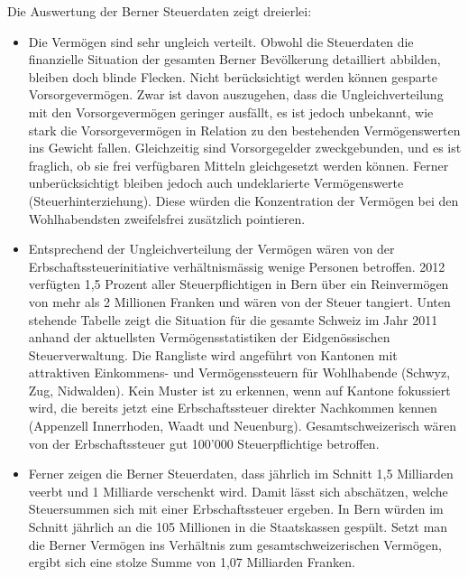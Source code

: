 \documentclass[a4paper, 12pt,liststotoc]{scrartcl}
\numberwithin{equation}{section}
\begin{document}
Die Auswertung der Berner Steuerdaten zeigt dreierlei:

\begin{itemize}
\item
  Die Vermögen sind sehr ungleich verteilt. Obwohl die Steuerdaten die
  finanzielle Situation der gesamten Berner Bevölkerung detailliert
  abbilden, bleiben doch blinde Flecken. Nicht berücksichtigt werden
  können gesparte Vorsorgevermögen. Zwar ist davon auszugehen, dass die
  Ungleichverteilung mit den Vorsorgevermögen geringer ausfällt, es ist
  jedoch unbekannt, wie stark die Vorsorgevermögen in Relation zu den
  bestehenden Vermögenswerten ins Gewicht fallen. Gleichzeitig sind
  Vorsorgegelder zweckgebunden, und es ist fraglich, ob sie frei
  verfügbaren Mitteln gleichgesetzt werden können. Ferner
  unberücksichtigt bleiben jedoch auch undeklarierte Vermögenswerte
  (Steuerhinterziehung). Diese würden die Konzentration der Vermögen bei
  den Wohlhabendsten zweifelsfrei zusätzlich pointieren.
\item
  Entsprechend der Ungleichverteilung der Vermögen wären von der
  Erbschaftssteuerinitiative verhältnismässig wenige Personen betroffen.
  2012 verfügten 1,5 Prozent aller Steuerpflichtigen in Bern über ein
  Reinvermögen von mehr als 2 Millionen Franken und wären von der Steuer
  tangiert. Unten stehende Tabelle zeigt die Situation für die gesamte
  Schweiz im Jahr 2011 anhand der aktuellsten Vermögensstatistiken der
  Eidgenössischen Steuerverwaltung. Die Rangliste wird angeführt von
  Kantonen mit attraktiven Einkommens- und Vermögenssteuern für
  Wohlhabende (Schwyz, Zug, Nidwalden). Kein Muster ist zu erkennen,
  wenn auf Kantone fokussiert wird, die bereits jetzt eine
  Erbschaftssteuer direkter Nachkommen kennen (Appenzell Innerrhoden,
  Waadt und Neuenburg). Gesamtschweizerisch wären von der
  Erbschaftssteuer gut 100'000 Steuerpflichtige betroffen.
\item
  Ferner zeigen die Berner Steuerdaten, dass jährlich im Schnitt 1,5
  Milliarden veerbt und 1 Milliarde verschenkt wird. Damit lässt sich
  abschätzen, welche Steuersummen sich mit einer Erbschaftssteuer
  ergeben. In Bern würden im Schnitt jährlich an die 105 Millionen in
  die Staatskassen gespült. Setzt man die Berner Vermögen ins Verhältnis
  zum gesamtschweizerischen Vermögen, ergibt sich eine stolze Summe von
  1,07 Milliarden Franken.
\end{itemize}
\end{document}
